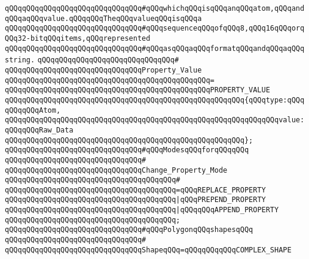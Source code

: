 \verb|qQQqqQQqqQQqqQQqqQQqqQQqqQQqqQQq#qQQqwhichqQQqisqQQqanqQQqatom,qQQqandqQQqaqQQqvalue.qQQqqQQqTheqQQqvalueqQQqisqQQqa|\newline
\verb|qQQqqQQqqQQqqQQqqQQqqQQqqQQqqQQq#qQQqsequenceqQQqofqQQq8,qQQq16qQQqorqQQq32-bitqQQqitems,qQQqrepresented|\newline
\verb|qQQqqQQqqQQqqQQqqQQqqQQqqQQqqQQq#qQQqasqQQqaqQQqformatqQQqandqQQqaqQQqstring.|\newline
\verb|qQQqqQQqqQQqqQQqqQQqqQQqqQQqqQQq#|\newline
\verb|qQQqqQQqqQQqqQQqqQQqqQQqqQQqqQQqProperty_Value|\newline
\verb|qQQqqQQqqQQqqQQqqQQqqQQqqQQqqQQqqQQqqQQqqQQqqQQq=|\newline
\verb|qQQqqQQqqQQqqQQqqQQqqQQqqQQqqQQqqQQqqQQqqQQqqQQqPROPERTY_VALUE|\newline
\verb|qQQqqQQqqQQqqQQqqQQqqQQqqQQqqQQqqQQqqQQqqQQqqQQqqQQqqQQq{qQQqtype:qQQqqQQqqQQqAtom,|\newline
\verb|qQQqqQQqqQQqqQQqqQQqqQQqqQQqqQQqqQQqqQQqqQQqqQQqqQQqqQQqqQQqqQQqvalue:qQQqqQQqRaw_Data|\newline
\verb|qQQqqQQqqQQqqQQqqQQqqQQqqQQqqQQqqQQqqQQqqQQqqQQqqQQqqQQq};|\newline
\newline
\verb|qQQqqQQqqQQqqQQqqQQqqQQqqQQqqQQq#qQQqModesqQQqforqQQqqQQq|\newline
\verb|qQQqqQQqqQQqqQQqqQQqqQQqqQQqqQQq#|\newline
\verb|qQQqqQQqqQQqqQQqqQQqqQQqqQQqqQQqChange_Property_Mode|\newline
\verb|qQQqqQQqqQQqqQQqqQQqqQQqqQQqqQQqqQQqqQQq#|\newline
\verb|qQQqqQQqqQQqqQQqqQQqqQQqqQQqqQQqqQQqqQQq=qQQqREPLACE_PROPERTY|\newline
\verb|qQQqqQQqqQQqqQQqqQQqqQQqqQQqqQQqqQQqqQQq|\verb#|qQQqPREPEND_PROPERTY#\newline
\verb|qQQqqQQqqQQqqQQqqQQqqQQqqQQqqQQqqQQqqQQq|\verb#|qQQqqQQqAPPEND_PROPERTY#\newline
\verb|qQQqqQQqqQQqqQQqqQQqqQQqqQQqqQQqqQQqqQQq;|\newline
\newline
\verb|qQQqqQQqqQQqqQQqqQQqqQQqqQQqqQQq#qQQqPolygonqQQqshapesqQQq|\newline
\verb|qQQqqQQqqQQqqQQqqQQqqQQqqQQqqQQq#|\newline
\verb|qQQqqQQqqQQqqQQqqQQqqQQqqQQqqQQqShapeqQQq=qQQqqQQqqQQqCOMPLEX_SHAPE|\newline
